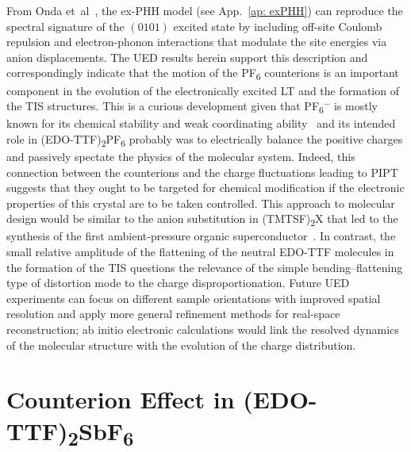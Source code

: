 From Onda et~al~\cite{Onda2008},
the ex-PHH model (see App.~\ref{ap: exPHH})
can reproduce the spectral signature of the $(0101)$ excited state
by including off-site Coulomb repulsion and electron-phonon interactions that
modulate the site energies via anion displacements.
%
The UED results herein support this description and correspondingly indicate that
the motion of the PF\textsubscript{6} counterions is an important component in the evolution of
the electronically excited LT and the formation of the TIS structures.
%
This is a curious development given that
PF\textsubscript{6}$^-$ is mostly known for its chemical stability and weak coordinating ability~\cite{Strauss1993}
and its intended role in (EDO-TTF)\textsubscript{2}PF\textsubscript{6}
probably was to electrically balance the positive charges and
passively spectate the physics of the molecular system.
%
Indeed, this connection between the counterions and the charge fluctuations leading to PIPT
suggests that they ought to be targeted for chemical modification
if the electronic properties of this crystal are to be taken controlled.
%
This approach to molecular design would be similar to the anion substitution in (TMTSF)\textsubscript{2}X
that led to the synthesis of the first ambient-pressure
organic superconductor~\cite{Bechgaard1980, Bechgaard1981}.
%
In contrast, the small relative amplitude of the flattening of the neutral EDO-TTF molecules
in the formation of the TIS questions the relevance of the simple bending--flattening type
of distortion mode to the charge disproportionation.
%
Future UED experiments can focus on different sample orientations with improved spatial resolution
and apply more general refinement methods for real-space reconstruction;
ab initio electronic calculations would link the resolved dynamics of the molecular structure with
the evolution of the charge distribution.


\section{Counterion Effect in (EDO-TTF)\textsubscript{2}SbF\textsubscript{6}}
\label{sec: UED-EDOSbF6}


